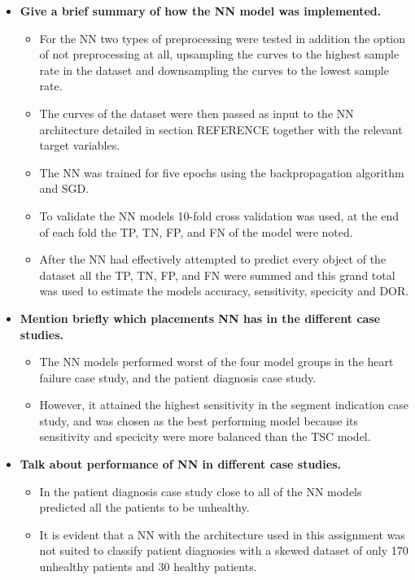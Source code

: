 \begin{itemize}
    \item \textbf{Give a brief summary of how the NN model was implemented.}
    \begin{itemize}
        \item For the NN two types of preprocessing were tested in addition the option of not preprocessing at all, upsampling the curves to the highest sample rate in the dataset and downsampling the curves to the lowest sample rate.
        \item The curves of the dataset were then passed as input to the NN architecture detailed in section REFERENCE together with the relevant target variables.
        \item The NN was trained for five epochs using the backpropagation algorithm and SGD.
        \item To validate the NN models 10-fold cross validation was used, at the end of each fold the TP, TN, FP, and FN of the model were noted. 
        \item After the NN had effectively attempted to predict every object of the dataset all the TP, TN, FP, and FN were summed and this grand total was used to estimate the models accuracy, sensitivity, specicity and DOR.
    \end{itemize}
    \item \textbf{Mention briefly which placements NN has in the different case studies.}
    \begin{itemize}
        \item The NN models performed worst of the four model groups in the heart failure case study, and the patient diagnosis case study.
        \item However, it attained the highest sensitivity in the segment indication case study, and was chosen as the best performing model because its sensitivity and specicity were more balanced than the TSC model.
    \end{itemize}
    \item \textbf{Talk about performance of NN in different case studies.}
    \begin{itemize}
        \item In the patient diagnosis case study close to all of the NN models predicted all the patients to be unhealthy. 
        \item It is evident that a NN with the architecture used in this assignment was not suited to classify patient diagnosies with a skewed dataset of only 170 unhealthy patients and 30 healthy patients.

\end{itemize}
\end{itemize}
